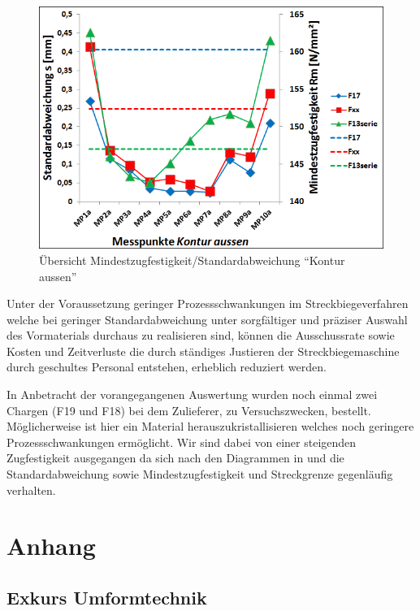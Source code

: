 \documentclass[12pt,a4paper,parskip,twoside,BCOR5mm,headsepline]{scrartcl}
\begin{document}
\begin{description*}
{\begin{figure}[hbtp]
\centering
\includegraphics[width=.8\textwidth]{standzugrel}
\caption{Übersicht Mindestzugfestigkeit/Standardabweichung "`Kontur aussen"'}
\label{fig:standzugrel}
\end{figure} 


Unter der Voraussetzung geringer Prozessschwankungen im Streckbiegeverfahren welche bei geringer Standardabweichung unter sorgfältiger und präziser Auswahl des Vormaterials durchaus zu realisieren sind, können die Ausschussrate sowie Kosten und Zeitverluste die durch ständiges Justieren der Streckbiegemaschine durch geschultes Personal entstehen, erheblich reduziert werden.

In Anbetracht der vorangegangenen Auswertung wurden noch einmal zwei Chargen (F19 und F18) bei dem Zulieferer, zu Versuchszwecken, bestellt. Möglicherweise ist hier ein Material herauszukristallisieren welches noch geringere Prozessschwankungen ermöglicht. Wir sind dabei von einer steigenden Zugfestigkeit ausgegangen da sich nach den Diagrammen in  und  die Standardabweichung sowie Mindestzugfestigkeit und Streckgrenze gegenläufig verhalten.


 











\newpage
\section{Anhang}
\subsection{Exkurs Umformtechnik}


}
\end{description*}
\end{document}
